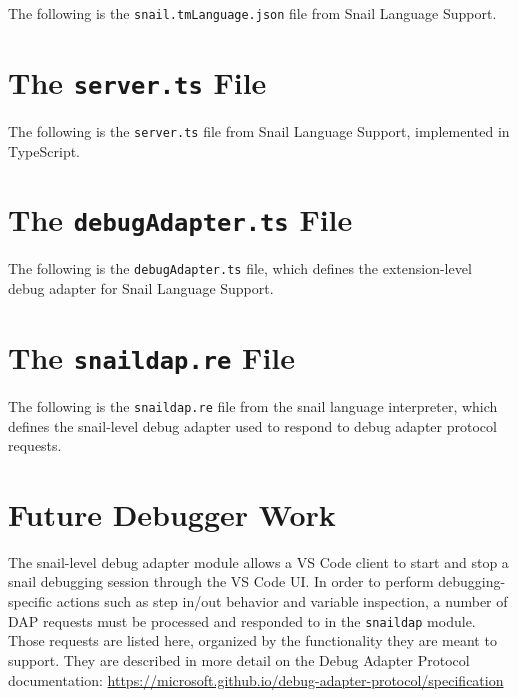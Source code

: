 \documentclass{article}
\begin{document}
\begin{appendices}
    The following is the \lstinline{snail.tmLanguage.json} file from Snail Language Support.
    
    \label{app:snail-tmLanguage}

\newpage
\section{The \lstinline{server.ts} File}

    The following is the \lstinline{server.ts} file from Snail Language Support, implemented in TypeScript.
    
    \label{app:server-ts}

\newpage
\section{The \lstinline{debugAdapter.ts} File}

    The following is the \lstinline{debugAdapter.ts} file, which defines the extension-level debug adapter for Snail Language Support.
    
    \label{app:debug-adapter-ts}

\newpage
\section{The \lstinline{snaildap.re} File}

    The following is the \lstinline{snaildap.re} file from the snail language interpreter, which defines the snail-level debug adapter used to respond to debug adapter protocol requests.
    
    \label{app:snaildap}
    
\newpage
\section{Future Debugger Work} 

    The snail-level debug adapter module allows a VS Code client to start and stop a snail debugging session through the VS Code UI. In order to perform debugging-specific actions such as step in/out behavior and variable inspection, a number of DAP requests must be processed and responded to in the \lstinline{snaildap} module. Those requests are listed here, organized by the functionality they are meant to support. They are described in more detail on the Debug Adapter Protocol documentation: \url{https://microsoft.github.io/debug-adapter-protocol/specification}


\end{appendices}
\end{document}
